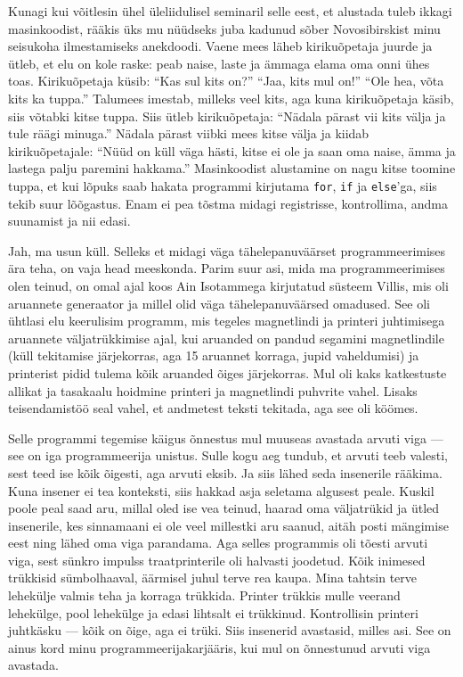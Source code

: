 Kunagi kui võitlesin ühel üleliidulisel 
seminaril selle eest, et alustada tuleb ikkagi masinkoodist, rääkis üks mu nüüdseks 
juba kadunud sõber Novosibirskist minu seisukoha 
ilmestamiseks anekdoodi. Vaene mees läheb 
kirikuõpetaja juurde ja ütleb, et elu on kole raske: peab naise, laste ja ämmaga
elama oma onni ühes toas. Kirikuõpetaja 
küsib: \enquote{Kas sul kits on?} \enquote{Jaa, kits mul on!} \enquote{Ole hea, võta kits ka tuppa.} Talumees imestab, milleks veel kits, aga kuna kirikuõpetaja käsib, siis võtabki 
kitse tuppa. Siis ütleb kirikuõpetaja: \enquote{Nädala pärast vii kits välja 
ja tule räägi minuga.} Nädala pärast viibki mees kitse välja ja kiidab kirikuõpetajale:
\enquote{Nüüd on küll väga hästi, kitse ei ole ja saan oma naise, ämma ja lastega palju paremini hakkama.} Masinkoodist alustamine on 
nagu kitse toomine tuppa, et kui lõpuks saab hakata programmi kirjutama 
\verb|for|, \verb|if| ja \verb|else|'ga, siis tekib suur lõõgastus. Enam ei pea 
tõstma midagi registrisse, kontrollima, andma suunamist ja nii edasi. 


Jah, ma usun küll. Selleks et midagi väga tähelepanuväärset programmeerimises ära teha, on vaja 
head meeskonda. Parim suur asi, mida ma
programmeerimises olen teinud, on omal ajal koos Ain Isotammega kirjutatud süsteem Villis, mis oli aruannete 
generaator ja millel olid väga tähelepanuväärsed omadused. See oli ühtlasi elu 
keerulisim programm, mis tegeles magnetlindi ja printeri juhtimisega 
aruannete väljatrükkimise ajal, kui aruanded on pandud segamini magnetlindile (küll tekitamise järjekorras, aga 15 aruannet korraga, jupid vaheldumisi) 
ja printerist pidid tulema kõik aruanded õiges järjekorras. Mul oli kaks 
katkestuste allikat ja tasakaalu hoidmine printeri ja magnetlindi 
puhvrite vahel. Lisaks teisendamistöö seal vahel, et andmetest teksti 
tekitada, aga see oli köömes. 

Selle programmi tegemise käigus õnnestus mul 
muuseas avastada arvuti viga --- see on iga programmeerija unistus. Sulle kogu 
aeg tundub, et arvuti teeb valesti, sest teed ise kõik õigesti, 
aga arvuti eksib. Ja siis lähed seda insenerile rääkima. Kuna 
insener ei tea konteksti, siis hakkad asja seletama
algusest peale. Kuskil poole peal saad aru, millal oled ise vea teinud, haarad oma väljatrükid ja 
ütled insenerile, kes sinnamaani ei ole veel millestki aru saanud, aitäh 
posti mängimise eest ning lähed oma viga parandama. Aga selles programmis oli tõesti
arvuti viga, sest sünkro impulss traatprinterile oli 
halvasti joodetud. Kõik inimesed trükkisid sümbolhaaval, äärmisel 
juhul terve rea kaupa. Mina tahtsin terve lehekülje valmis teha ja
korraga trükkida. Printer trükkis mulle veerand lehekülge, pool 
lehekülge ja edasi lihtsalt ei trükkinud. Kontrollisin printeri juhtkäsku --- 
kõik on õige, aga ei trüki. Siis insenerid avastasid, 
milles asi. See on ainus kord minu programmeerijakarjääris, kui mul on õnnestunud 
arvuti viga avastada. 

